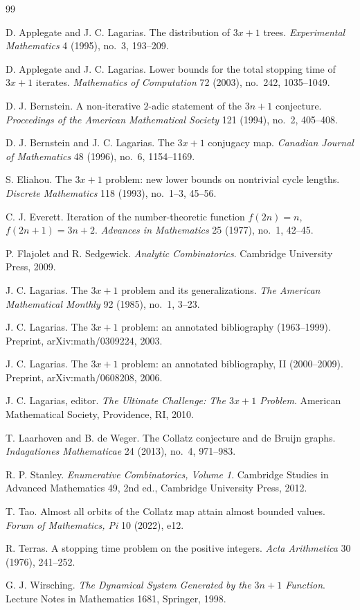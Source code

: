 \documentclass[11pt]{amsart}
\theoremstyle{definition}
\theoremstyle{remark}
\begin{document}
\begin{thebibliography}{99}

D. Applegate and J. C. Lagarias.
The distribution of $3x+1$ trees.
\emph{Experimental Mathematics} 4 (1995), no.~3, 193--209.

D. Applegate and J. C. Lagarias.
Lower bounds for the total stopping time of $3x+1$ iterates.
\emph{Mathematics of Computation} 72 (2003), no.~242, 1035--1049.

D. J. Bernstein.
A non-iterative $2$-adic statement of the $3n+1$ conjecture.
\emph{Proceedings of the American Mathematical Society} 121 (1994), no.~2, 405--408.

D. J. Bernstein and J. C. Lagarias.
The $3x+1$ conjugacy map.
\emph{Canadian Journal of Mathematics} 48 (1996), no.~6, 1154--1169.

S. Eliahou.
The $3x+1$ problem: new lower bounds on nontrivial cycle lengths.
\emph{Discrete Mathematics} 118 (1993), no.~1--3, 45--56.

C. J. Everett.
Iteration of the number-theoretic function $f(2n)=n$, $f(2n+1)=3n+2$.
\emph{Advances in Mathematics} 25 (1977), no.~1, 42--45.

P. Flajolet and R. Sedgewick.
\emph{Analytic Combinatorics}.
Cambridge University Press, 2009.

J. C. Lagarias.
The $3x+1$ problem and its generalizations.
\emph{The American Mathematical Monthly} 92 (1985), no.~1, 3--23.

J. C. Lagarias.
The $3x+1$ problem: an annotated bibliography (1963--1999).
Preprint, arXiv:math/0309224, 2003.

J. C. Lagarias.
The $3x+1$ problem: an annotated bibliography, II (2000--2009).
Preprint, arXiv:math/0608208, 2006.

J. C. Lagarias, editor.
\emph{The Ultimate Challenge: The $3x+1$ Problem}.
American Mathematical Society, Providence, RI, 2010.

T. Laarhoven and B. de Weger.
The Collatz conjecture and de Bruijn graphs.
\emph{Indagationes Mathematicae} 24 (2013), no.~4, 971--983.

R. P. Stanley.
\emph{Enumerative Combinatorics, Volume 1}.
Cambridge Studies in Advanced Mathematics 49, 2nd ed., Cambridge University Press, 2012.

T. Tao.
Almost all orbits of the Collatz map attain almost bounded values.
\emph{Forum of Mathematics, Pi} 10 (2022), e12.

R. Terras.
A stopping time problem on the positive integers.
\emph{Acta Arithmetica} 30 (1976), 241--252.

G. J. Wirsching.
\emph{The Dynamical System Generated by the $3n+1$ Function}.
Lecture Notes in Mathematics 1681, Springer, 1998.

\end{thebibliography}
\end{document}
